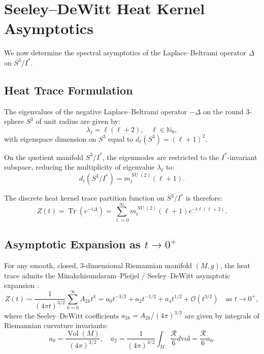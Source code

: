 \documentclass[11pt,a4paper]{article}
\theoremstyle{definition}
\DeclareMathOperator{\Tr}{Tr}
\DeclareMathOperator{\Vol}{Vol}
\DeclareMathOperator{\SU}{SU}
\begin{document}
\section{Seeley--DeWitt Heat Kernel Asymptotics}

We now determine the spectral asymptotics of the Laplace--Beltrami operator $\Delta$ on $S^3 / I^*$.

\subsection{Heat Trace Formulation}
The eigenvalues of the negative Laplace--Beltrami operator $-\Delta$ on the round 3-sphere $S^3$ of unit radius are given by:
\begin{equation}
\lambda_\ell = \ell(\ell + 2), \quad \ell \in \mathbb{N}_0,
\end{equation}
with eigenspace dimension on $S^3$ equal to $d_\ell(S^3) = (\ell + 1)^2$.

On the quotient manifold $S^3 / I^*$, the eigenmodes are restricted to the $I^*$-invariant subspace, reducing the multiplicity of eigenvalue $\lambda_\ell$ to:
\begin{equation}
d_\ell(S^3 / I^*) = m_\ell^{\SU(2)} (\ell + 1).
\end{equation}

The discrete heat kernel trace partition function on $S^3 / I^*$ is therefore:
\begin{equation}
Z(t) = \Tr\left(e^{-t \Delta}\right) = \sum_{\ell=0}^\infty m_\ell^{\SU(2)} (\ell + 1) e^{-t \ell(\ell + 2)}.
\end{equation}

\subsection{Asymptotic Expansion as $t \to 0^+$}
For any smooth, closed, 3-dimensional Riemannian manifold $(M, g)$, the heat trace admits the Minakshisundaram--Pleijel / Seeley--DeWitt asymptotic expansion \cite{Seeley1967,Gilkey1995,Vassilevich2003}:
\begin{equation}
Z(t) \sim \frac{1}{(4 \pi t)^{3/2}} \sum_{k=0}^\infty A_{2k} t^k = a_0 t^{-3/2} + a_2 t^{-1/2} + a_4 t^{1/2} + \mathcal{O}\left(t^{3/2}\right) \quad \text{as } t \to 0^+,
\end{equation}
where the Seeley--DeWitt coefficients $a_{2k} = A_{2k} / (4 \pi)^{3/2}$ are given by integrals of Riemannian curvature invariants:
\begin{equation}
a_0 = \frac{\Vol(M)}{(4 \pi)^{3/2}}, \quad a_2 = \frac{1}{(4 \pi)^{3/2}} \int_M \frac{\mathcal{R}}{6} d\mathrm{vol} = \frac{\mathcal{R}}{6} a_0.
\end{equation}
\end{document}

